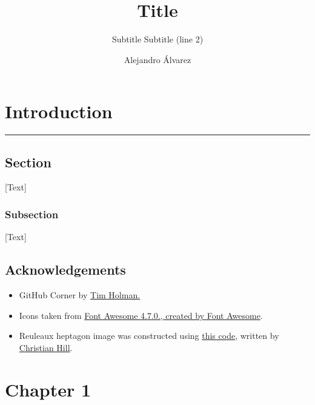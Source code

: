 \documentclass[
]{book}
\title{Title}
\subtitle{{Subtitle}
{Subtitle (line 2)}}
\author{{Alejandro Álvarez}}
\date{}
\begin{document}
\maketitle

{
\setcounter{tocdepth}{1}
\tableofcontents
}
\hypertarget{intro}{%
\chapter*{Introduction}\label{intro}}

\begin{center}\rule{0.5\linewidth}{0.5pt}\end{center}

\hypertarget{section}{%
\section*{Section}\label{section}}

{[}Text{]}

\hypertarget{subsection}{%
\subsection*{Subsection}\label{subsection}}

{[}Text{]}

\hypertarget{acknowledgements}{%
\section*{Acknowledgements}\label{acknowledgements}}

\begin{itemize}
\item
  GitHub Corner by \href{http://tholman.com}{Tim Holman.}
\item
  Icons taken from \href{https://fontawesome.com/v4.7.0/icons/}{Font Awesome 4.7.0., created by Font Awesome}.
\item
  Reuleaux heptagon image was constructed using \href{https://github.com/scipython/scipython-maths/blob/master/reuleaux/make_reuleaux_construction.py}{this code}, written by \href{https://github.com/scipython}{Christian Hill}.
\end{itemize}

\hypertarget{ch1}{%
\chapter*{Chapter 1}\label{ch1}}
\end{document}
